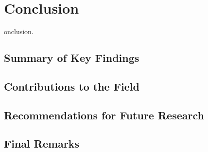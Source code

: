 \chapter{Conclusion}\label{ch07}

onclusion.

\section{Summary of Key Findings}

\section{Contributions to the Field}

\section{Recommendations for Future Research}

\section{Final Remarks}

